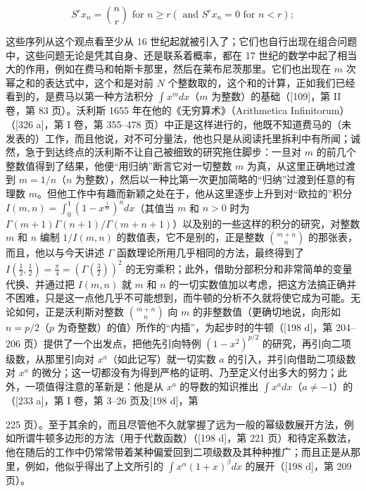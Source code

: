\[
S ^ {r} x _ {n} = \binom{n}{r} \text { for } n \geq r (\text { and } S ^ {r} x _ {n} = 0 \text { for } n <   r);
\]

这些序列从这个观点看至少从 16 世纪起就被引入了；它们也自行出现在组合问题中，这些问题无论是凭其自身、还是联系着概率，都在 17 世纪的数学中起了相当大的作用，例如在费马和帕斯卡那里，然后在莱布尼茨那里。它们也出现在 \(m\) 次幂之和的表达式中，这个和是对前 \(N\) 个整数取的，这个和的计算，正如我们已经看到的，是费马以第一种方法积分 \(\int x^{m}dx\)（\(m\) 为整数）的基础（{[}109{]}，第 II 卷，第 83 页）。沃利斯 1655 年在他的《无穷算术》（Arithmetica Infinitorum）（{[}326 a{]}，第 I 卷，第 355–478 页）中正是这样进行的，他既不知道费马的（未发表的）工作，而且他说，对不可分量法，他也只是从阅读托里拆利中有所闻；诚然，急于到达终点的沃利斯不让自己被细致的研究拖住脚步：一旦对 \(m\) 的前几个整数值得到了结果，他便“用归纳”断言它对一切整数 \(m\) 为真，从这里正确地过渡到 \(m = 1/n\)（\(n\) 为整数），然后以一种比第一次更加简略的“归纳”过渡到任意的有理数 \(m\)。但他工作中有趣而新颖之处在于，他从这里逐步上升到对“欧拉的”积分 \(I(m,n) = \int_{0}^{1}(1 - x^{\frac{1}{m}})^{n}dx\)（其值当 \(m\) 和 \(n > 0\) 时为 \(\Gamma(m+1)\Gamma(n+1)/\Gamma(m+n+1)\)）以及别的一些这样的积分的研究，对整数 \(m\) 和 \(n\) 编制 \(1/I(m,n)\) 的数值表，它不是别的，正是整数 \(\binom{m+n}{n}\) 的那张表，而且，他以与今天讲述 \(\Gamma\) 函数理论所用几乎相同的方法，最终得到了 \(I\left(\frac{1}{2},\frac{1}{2}\right)=\frac{\pi}{4}=\left(\Gamma\left(\frac{3}{2}\right)\right)^{2}\) 的无穷乘积；此外，借助分部积分和非常简单的变量代换、并通过把 \(I(m,n)\) 就 \(m\) 和 \(n\) 的一切实数值加以考虑，把这方法搞正确并不困难，只是这一点他几乎不可能想到，而牛顿的分析不久就将使它成为可能。无论如何，正是沃利斯对整数 \(\binom{m+n}{n}\) 向 \(m\) 的非整数值（更确切地说，向形如 \(n=p/2\)（\(p\) 为奇整数）的值）所作的“内插”，为起步时的牛顿（{[}198 d{]}，第 204–206 页）提供了一个出发点，把他先引向特例 \((1-x^{2})^{p/2}\) 的研究，再引向二项级数，从那里引向对 \(x^{a}\)（如此记写）就一切实数 \(a\) 的引入，并引向借助二项级数对 \(x^{a}\) 的微分；这一切都没有为得到严格的证明、乃至定义付出多大的努力；此外，一项值得注意的革新是：他是从 \(x^{a}\) 的导数的知识推出 \(\int x^{a}dx\)（\(a \neq -1\)）的（{[}233 a{]}，第 I 卷，第 3–26 页及{[}198 d{]}，第

225 页）。至于其余的，而且尽管他不久就掌握了远为一般的幂级数展开方法，例如所谓牛顿多边形的方法（用于代数函数）（{[}198 d{]}，第 221 页）和待定系数法，他在随后的工作中仍常常带着某种偏爱回到二项级数及其种种推广；而且正是从那里，例如，他似乎得出了上文所引的 \(\int x^{\alpha}(1 + x)^{\beta} dx\) 的展开（{[}198 d{]}，第 209 页）。

